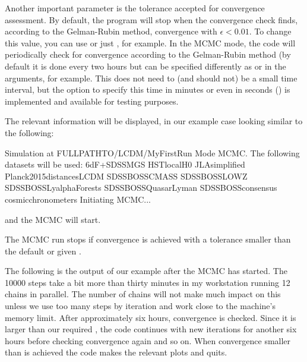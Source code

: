\documentclass[letterpaper,12pt,english]{sphinxhowto}
\begin{document}
Another important parameter is the tolerance accepted for convergence assessment.
By default, the program will stop when the convergence check finds, according
to the Gelman-Rubin method, convergence with \(\epsilon < 0.01\).
To change this value, you can use  or just ,
for example.
In the MCMC mode, the code will periodically check for convergence according
to the Gelman-Rubin method (by default it is done every two hours but can be
specified differently as  or  in the
arguments, for example.
This does not need to (and should not) be a small time interval, but the option
to specify this time in minutes or even in seconds () is implemented
and available for testing purposes.

The relevant information will be displayed, in our example case looking
similar to the following:

%
\begin{sphinxVerbatim}[commandchars=\\\{\}]
Simulation at \PYGZlt{}FULL\PYGZhy{}PATH\PYGZhy{}TO\PYGZgt{}/LCDM/MyFirstRun
Mode MCMC.
The following datasets will be used:
    6dF+SDSS\PYGZus{}MGS
    HST\PYGZus{}local\PYGZus{}H0
    JLA\PYGZus{}simplified
    Planck2015\PYGZus{}distances\PYGZus{}LCDM
    SDSS\PYGZus{}BOSS\PYGZus{}CMASS
    SDSS\PYGZus{}BOSS\PYGZus{}LOWZ
    SDSS\PYGZus{}BOSS\PYGZus{}Lyalpha\PYGZhy{}Forests
    SDSS\PYGZus{}BOSS\PYGZus{}QuasarLyman
    SDSS\PYGZus{}BOSS\PYGZus{}consensus
    cosmic\PYGZus{}chronometers
Initiating MCMC...
\end{sphinxVerbatim}

and the MCMC will start.

The MCMC run stops if convergence is achieved with a tolerance smaller than
the default or given .

The following is the output of our example after the MCMC has started.
The 10000 steps take a bit more than thirty minutes in my workstation running 12
chains in parallel.
The number of chains will not make much impact on this unless we use too many
steps by iteration and work close to the machine’s memory limit.
After approximately six hours, convergence is checked. Since it is larger than
our required , the code continues with new iterations for another six
hours before checking convergence again and so on. When convergence smaller than
 is achieved the code makes the relevant plots and quits.
\end{document}
